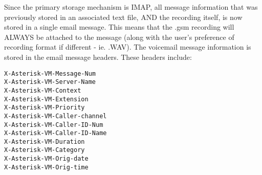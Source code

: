 Since the primary storage mechanism is IMAP, all message information that
was previously stored in an associated text file, AND the recording itself,
is now stored in a single email message.  This means that the .gsm recording
will ALWAYS be attached to the message (along with the user's preference of
recording format if different - ie. .WAV).  The voicemail message information
is stored in the email message headers.  These headers include:

\begin{verbatim}
X-Asterisk-VM-Message-Num
X-Asterisk-VM-Server-Name
X-Asterisk-VM-Context
X-Asterisk-VM-Extension
X-Asterisk-VM-Priority
X-Asterisk-VM-Caller-channel
X-Asterisk-VM-Caller-ID-Num
X-Asterisk-VM-Caller-ID-Name
X-Asterisk-VM-Duration
X-Asterisk-VM-Category
X-Asterisk-VM-Orig-date
X-Asterisk-VM-Orig-time
\end{verbatim}
